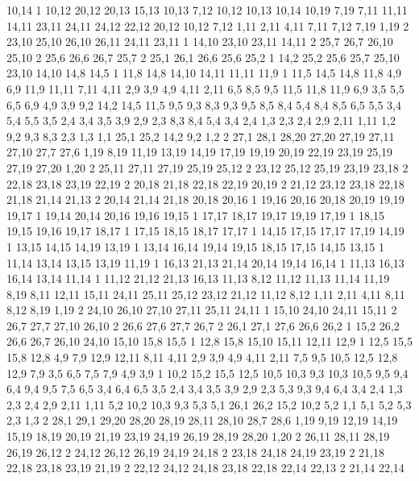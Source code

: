10,14
1%
10,12
20,12
20,13
15,13
10,13
%
7,12
10,12
10,13
10,14
10,19
7,19
%
7,11
11,11
14,11
23,11
24,11
24,12
22,12
20,12
10,12
7,12
%
1,11
2,11
4,11
7,11
7,12
7,19
1,19
2%
23,10
25,10
26,10
26,11
24,11
23,11
1%
14,10
23,10
23,11
14,11
2%
25,7
26,7
26,10
25,10
2%
25,6
26,6
26,7
25,7
2%
25,1
26,1
26,6
25,6
25,2
1%
14,2
25,2
25,6
25,7
25,10
23,10
14,10
14,8
14,5
1%
11,8
14,8
14,10
14,11
11,11
11,9
1%
11,5
14,5
14,8
11,8
%
4,9
6,9
11,9
11,11
7,11
4,11
%
2,9
3,9
4,9
4,11
2,11
%
6,5
8,5
9,5
11,5
11,8
11,9
6,9
%
3,5
5,5
6,5
6,9
4,9
3,9
%
9,2
14,2
14,5
11,5
9,5
9,3
%
8,3
9,3
9,5
8,5
8,4
%
5,4
8,4
8,5
6,5
5,5
%
3,4
5,4
5,5
3,5
%
2,4
3,4
3,5
3,9
2,9
%
2,3
8,3
8,4
5,4
3,4
2,4
%
1,3
2,3
2,4
2,9
2,11
1,11
%
1,2
9,2
9,3
8,3
2,3
1,3
%
1,1
25,1
25,2
14,2
9,2
1,2
2%
27,1
28,1
28,20
27,20
27,19
27,11
27,10
27,7
27,6
%
1,19
8,19
11,19
13,19
14,19
17,19
19,19
20,19
22,19
23,19
25,19
27,19
27,20
1,20
2%
25,11
27,11
27,19
25,19
25,12
2%
23,12
25,12
25,19
23,19
23,18
2%
22,18
23,18
23,19
22,19
2%
20,18
21,18
22,18
22,19
20,19
2%
21,12
23,12
23,18
22,18
21,18
21,14
21,13
2%
20,14
21,14
21,18
20,18
20,16
1%
19,16
20,16
20,18
20,19
19,19
19,17
1%
19,14
20,14
20,16
19,16
19,15
1%
17,17
18,17
19,17
19,19
17,19
1%
18,15
19,15
19,16
19,17
18,17
1%
17,15
18,15
18,17
17,17
1%
14,15
17,15
17,17
17,19
14,19
1%
13,15
14,15
14,19
13,19
1%
13,14
16,14
19,14
19,15
18,15
17,15
14,15
13,15
1%
11,14
13,14
13,15
13,19
11,19
1%
16,13
21,13
21,14
20,14
19,14
16,14
1%
11,13
16,13
16,14
13,14
11,14
1%
11,12
21,12
21,13
16,13
11,13
%
8,12
11,12
11,13
11,14
11,19
8,19
%
8,11
12,11
15,11
24,11
25,11
25,12
23,12
21,12
11,12
8,12
%
1,11
2,11
4,11
8,11
8,12
8,19
1,19
2%
24,10
26,10
27,10
27,11
25,11
24,11
1%
15,10
24,10
24,11
15,11
2%
26,7
27,7
27,10
26,10
2%
26,6
27,6
27,7
26,7
2%
26,1
27,1
27,6
26,6
26,2
1%
15,2
26,2
26,6
26,7
26,10
24,10
15,10
15,8
15,5
1%
12,8
15,8
15,10
15,11
12,11
12,9
1%
12,5
15,5
15,8
12,8
%
4,9
7,9
12,9
12,11
8,11
4,11
%
2,9
3,9
4,9
4,11
2,11
%
7,5
9,5
10,5
12,5
12,8
12,9
7,9
%
3,5
6,5
7,5
7,9
4,9
3,9
1%
10,2
15,2
15,5
12,5
10,5
10,3
%
9,3
10,3
10,5
9,5
9,4
%
6,4
9,4
9,5
7,5
6,5
%
3,4
6,4
6,5
3,5
%
2,4
3,4
3,5
3,9
2,9
%
2,3
5,3
9,3
9,4
6,4
3,4
2,4
%
1,3
2,3
2,4
2,9
2,11
1,11
%
5,2
10,2
10,3
9,3
5,3
%
5,1
26,1
26,2
15,2
10,2
5,2
%
1,1
5,1
5,2
5,3
2,3
1,3
2%
28,1
29,1
29,20
28,20
28,19
28,11
28,10
28,7
28,6
%
1,19
9,19
12,19
14,19
15,19
18,19
20,19
21,19
23,19
24,19
26,19
28,19
28,20
1,20
2%
26,11
28,11
28,19
26,19
26,12
2%
24,12
26,12
26,19
24,19
24,18
2%
23,18
24,18
24,19
23,19
2%
21,18
22,18
23,18
23,19
21,19
2%
22,12
24,12
24,18
23,18
22,18
22,14
22,13
2%
21,14
22,14

